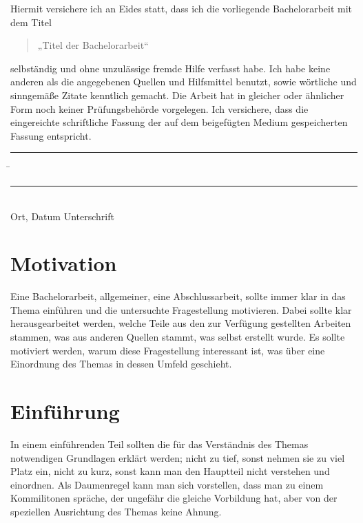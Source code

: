 \documentclass[12pt]{article}
\theoremstyle{definition}
\numberwithin{equation}{section}
\begin{document}
Hiermit versichere ich an Eides statt, dass ich die vorliegende
Bachelorarbeit mit dem Titel
\begin{quote}
  „Titel der Bachelorarbeit“  
\end{quote}
selbständig und ohne unzulässige fremde Hilfe verfasst habe. Ich habe
keine anderen als die angegebenen Quellen und Hilfsmittel benutzt,
sowie wörtliche und sinngemäße Zitate kenntlich gemacht. Die Arbeit
hat in gleicher oder ähnlicher Form noch keiner Prüfungsbehörde
vorgelegen. Ich versichere, dass die eingereichte schriftliche Fassung
der auf dem beigefügten Medium gespeicherten Fassung entspricht.

\vspace*{3em}

\begin{tabbing}
  \rule{.4\textwidth}{1pt} \hspace*{.2\textwidth}
  \= \rule{.4\textwidth}{1pt} \\
  Ort, Datum \> Unterschrift
\end{tabbing}

\newpage
\mbox{}
\newpage
\tableofcontents
\newpage
\listoffigures
\newpage

\section{Motivation}
\label{sec:Motivation}

Eine Bachelorarbeit, allgemeiner, eine Abschlussarbeit, sollte immer
klar in das Thema einführen und die untersuchte Fragestellung
motivieren. Dabei sollte klar herausgearbeitet werden, welche Teile
aus den zur Verfügung gestellten Arbeiten stammen, was aus anderen
Quellen stammt, was selbst erstellt wurde. Es sollte motiviert werden,
warum diese Fragestellung interessant ist, was über eine Einordnung
des Themas in dessen Umfeld geschieht.

\section{Einführung}
\label{sec:Einfuehrung}

In einem einführenden Teil sollten die für das Verständnis des Themas
notwendigen Grundlagen erklärt werden; nicht zu tief, sonst nehmen sie
zu viel Platz ein, nicht zu kurz, sonst kann man den Hauptteil nicht
verstehen und einordnen. Als Daumenregel kann man sich vorstellen,
dass man zu einem Kommilitonen spräche, der ungefähr die gleiche
Vorbildung hat, aber von der speziellen Ausrichtung des Themas keine
Ahnung.
\end{document}
